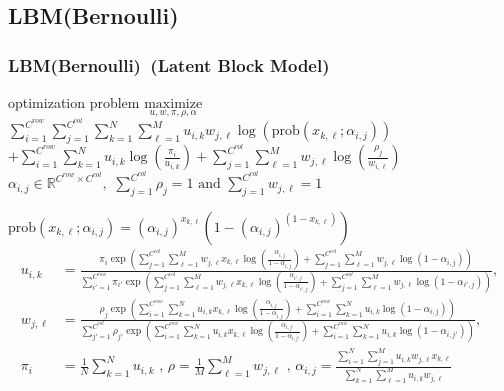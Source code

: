 \documentclass[fleqn,dvipdfmx,10pt]{beamer}
\begin{document}
\subsection{LBM(Bernoulli)}
\small
\begin{frame}\frametitle{LBM(Bernoulli)~\small{(Latent Block Model)}}
  \begin{block}{optimization problem}
    $\underset{u,w,\pi,\rho,\alpha}{\text{maximize}}$
    $\sum_{i=1}^{C^{row}}\sum_{j=1}^{C^{col}}\sum_{k=1}^N\sum_{\ell=1}^Mu_{i,k}w_{j,\ell}\log\left(\text{prob}(x_{k,\ell};\alpha_{i,j})\right)$\\
    $+\sum_{i=1}^{C^{row}}\sum_{k=1}^N u_{i,k}\log{(\frac{\pi_i}{u_{i,k}})}+\sum_{j=1}^{C^{col}}\sum_{\ell=1}^M w_{j,\ell}\log{(\frac{\rho_{j}}{w_{i,\ell}})}$\centering\\
    $\alpha_{i,j}\in \mathbb{R}^{C^{row}\times C^{col}},$  $\sum_{j=1}^{C^{col}} \rho_{j}=1 \text{ and } \sum_{j=1}^{C^{col}} w_{j,\ell}=1$\\
  \end{block}
  $\text{prob}(x_{k,\ell};\alpha_{i,j})=(\alpha_{i,j})^{x_{k,\ell}}(1-(\alpha_{i,j})^{(1-x_{k,\ell})})$\centering
  \begin{align*}
    u_{i,k}&=\frac{\pi_i\exp\left(\sum_{j=1}^{C^{col}}\sum_{\ell=1}^M
      w_{j,\ell}x_{k,\ell}\log(\frac{\alpha_{i,j}}{1-\alpha_{i,j}})
      +\sum_{j=1}^{C^{col}}\sum_{\ell=1}^M w_{j,\ell}\log(1-\alpha_{i,j})\right)}
    {\sum_{i'=1}^{C^{row}} \pi_{i'}\exp\left(\sum_{j=1}^{C^{col}}\sum_{\ell=1}^M
      w_{j,\ell}x_{k,\ell}\log(\frac{\alpha_{i',j}}{1-\alpha_{i',j}})
      +\sum_{j=1}^{C^{col}}\sum_{\ell=1}^M w_{j,\ell}\log(1-\alpha_{i',j})\right)},\\
    w_{j,\ell}&=\frac{\rho_j\exp\left(\sum_{i=1}^{C^{row}}\sum_{k=1}^N u_{i,k}x_{k,\ell}\log(\frac{\alpha_{i,j}}{1-\alpha_{i,j}})
      +\sum_{i=1}^{C^{row}}\sum_{k=1}^N u_{i,k}\log(1-\alpha_{i,j})\right)}
    {\sum_{j'=1}^{C^{col}} \rho_{j'}\exp\left(\sum_{i=1}^{C^{row}}\sum_{k=1}^N
      u_{i,k}x_{k,\ell}\log(\frac{\alpha_{i,j'}}{1-\alpha_{i,j'}})
      +\sum_{i=1}^{C^{row}}\sum_{k=1}^N u_{i,k}\log(1-\alpha_{i,j'})\right)},\\
    \pi_i&=\frac{1}{N}\sum_{k=1}^Nu_{i,k}\text{ , }\rho=\frac{1}{M}\sum_{\ell=1}^Mw_{j,\ell}\text{ , }
    \alpha_{i,j}=\frac{\sum_{i=1}^N\sum_{j=1}^Mu_{i,k}w_{j,\ell}x_{k,\ell}}{\sum_{k=1}^N\sum_{\ell=1}^Mu_{i,k}w_{j,\ell}}
  \end{align*}
\end{frame}
\end{document}
